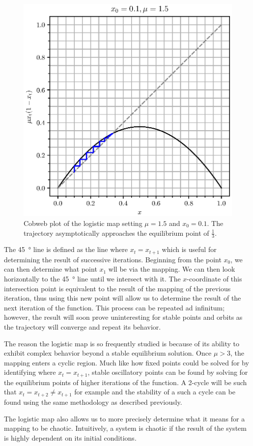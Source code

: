 \begin{figure}
    \centering
    \includegraphics[height=0.4\textheight]{log_fixed_cob.eps}
    \caption{Cobweb plot of the logistic map setting $\mu=1.5$ and $x_0=0.1$. The trajectory asymptotically approaches the equilibrium point of $\frac{1}{3}$.}
    \label{log_fixed_cob}
\end{figure}
The \SI{45}{\degree} line is defined as the line where $x_t=x_{t+1}$ which is useful for determining the result of successive iterations. Beginning from the point $x_0$, we can then determine what point $x_1$ wll be via the mapping. We can then look horizontally to the \SI{45}{\degree} line until we intersect with it. The $x$-coordinate of this intersection point is equivalent to the result of the mapping of the previous iteration, thus using this new point will allow us to determine the result of the next iteration of the function. This process can be repeated ad infinitum; however, the result will soon prove uninteresting for stable points and orbits as the trajectory will converge and repeat its behavior.

The reason the logistic map is so frequently studied is because of its ability to exhibit complex behavior beyond a stable equilibrium solution. Once $\mu>3$, the mapping enters a cyclic region. Much like how fixed points could be solved for by identifying where $x_{t}=x_{t+1}$, stable oscillatory points can be found by solving for the equilibrium points of higher iterations of the function. A 2-cycle will be such that $x_{t}=x_{t+2}\neq x_{t+1}$ for example and the stability of a such a cycle can be found using the same methodology as described previously. 

The logistic map also allows us to more precisely determine what it means for a mapping to be chaotic. Intuitively, a system is chaotic if the result of the system is highly dependent on its initial conditions. 

